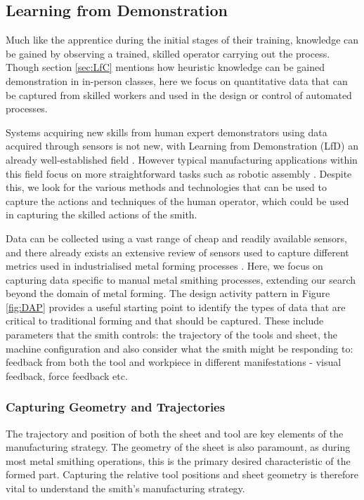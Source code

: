 \subsection{Learning from Demonstration} \label{sec:LfD} 
Much like the apprentice during the initial stages of their training, knowledge can be gained by observing a trained, skilled operator carrying out the process. Though section \ref{sec:LfC} mentions how heuristic knowledge can be gained demonstration in in-person classes, here we focus on quantitative data that can be captured from skilled workers and used in the design or control of automated processes.

Systems acquiring new skills from human expert demonstrators using data acquired through sensors is not new, with Learning from Demonstration (LfD)  an already well-established field \citep{Ravichandar2020RecentDemonstration}. 
However typical manufacturing applications within this field focus on more straightforward tasks such as robotic assembly \citep{Zhu2018RobotSurvey}. Despite this, we look for the various methods and technologies that can be used to capture the actions and techniques of the human operator, which could be used in capturing the skilled actions of the smith.

Data can be collected using a vast range of cheap and readily available sensors, and there already exists an extensive review of sensors used to capture different metrics used in industrialised metal forming processes \citep{Allwood2016Closed-loopForming}. Here, we focus on capturing data specific to manual metal smithing processes, extending our search beyond the domain of metal forming. The design activity pattern in Figure \ref{fig:DAP} provides a useful starting point to identify the types of data that are critical to traditional forming and that should be captured. These include parameters that the smith controls: the trajectory of the tools and sheet, the machine configuration and also consider what the smith might be responding to: feedback from both the tool and workpiece in different manifestations - visual feedback, force feedback etc. 

\subsubsection{Capturing Geometry and Trajectories}
The trajectory and position of both the sheet and tool are key elements of the manufacturing strategy. The geometry of the sheet is also paramount, as during most metal smithing operations, this is the primary desired characteristic of the formed part. Capturing the relative tool positions and sheet geometry is therefore vital to understand the smith’s manufacturing strategy.

